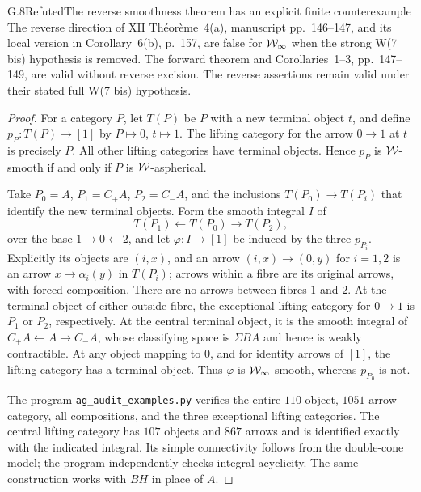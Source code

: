 \begin{claim}{G.8}{Refuted}{The reverse smoothness theorem has an explicit finite counterexample}
The reverse direction of XII Th\'eor\`eme~4(a), manuscript pp.~146--147, and its local version in Corollary~6(b), p.~157, are false for $\mathcal{W}_{\infty}$ when the strong W(7 bis) hypothesis is removed. The forward theorem and Corollaries~1--3, pp.~147--149, are valid without reverse excision. The reverse assertions remain valid under their stated full W(7 bis) hypothesis.
\end{claim}
\begin{proof}
For a category $P$, let $T(P)$ be $P$ with a new terminal object $t$, and define $p_P:T(P)\to[1]$ by $P\mapsto0$, $t\mapsto1$. The lifting category for the arrow $0\to1$ at $t$ is precisely $P$. All other lifting categories have terminal objects. Hence $p_P$ is $\mathcal{W}$-smooth if and only if $P$ is $\mathcal{W}$-aspherical.

Take $P_0=A$, $P_1=C_+A$, $P_2=C_-A$, and the inclusions $T(P_0)\to T(P_i)$ that identify the new terminal objects. Form the smooth integral $I$ of
\[
T(P_1)\longleftarrow T(P_0)\longrightarrow T(P_2),
\]
over the base $1\to0\leftarrow2$, and let $\varphi:I\to[1]$ be induced by the three $p_{P_i}$. Explicitly its objects are $(i,x)$, and an arrow $(i,x)\to(0,y)$ for $i=1,2$ is an arrow $x\to\alpha_i(y)$ in $T(P_i)$; arrows within a fibre are its original arrows, with forced composition. There are no arrows between fibres $1$ and $2$. At the terminal object of either outside fibre, the exceptional lifting category for $0\to1$ is $P_1$ or $P_2$, respectively. At the central terminal object, it is the smooth integral of $C_+A\leftarrow A\to C_-A$, whose classifying space is $\Sigma BA$ and hence is weakly contractible. At any object mapping to $0$, and for identity arrows of $[1]$, the lifting category has a terminal object. Thus $\varphi$ is $\mathcal{W}_{\infty}$-smooth, whereas $p_{P_0}$ is not.

The program \texttt{ag\_audit\_examples.py} verifies the entire $110$-object, $1051$-arrow category, all compositions, and the three exceptional lifting categories. The central lifting category has $107$ objects and $867$ arrows and is identified exactly with the indicated integral. Its simple connectivity follows from the double-cone model; the program independently checks integral acyclicity. The same construction works with $BH$ in place of $A$.


\end{proof}

